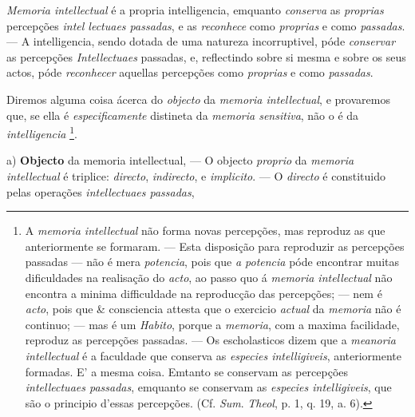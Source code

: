 
\emph{Memoria intellectual} é a propria intelligencia, emquanto \emph{conserva} as \emph{proprias} percepções \emph{intel lectuaes passadas}, e as \emph{reconhece} como \emph{proprias} e como \emph{passadas}. --- A intelligencia, sendo dotada de uma natureza incorruptivel, póde \emph{conservar} as percepções \emph{Intellectuaes} passadas, e, reflectindo     sobre si mesma e sobre os seus actos, póde \emph{reconhecer} aquellas percepções como \emph{proprias} e como \emph{passadas}.

Diremos alguma coisa ácerca do \emph{objecto} da \emph{memoria intellectual}, e provaremos que, se ella é \emph{especificamente} distineta da \emph{memoria sensitiva}, não o é da \emph{intelligencia} \footnote{A \emph{memoria intellectual} não forma novas percepções, mas reproduz as que anteriormente se formaram. --- Esta disposição para reproduzir as percepções passadas --- não é mera \emph{potencia}, pois que \emph{a potencia} póde encontrar muitas dificuldades na realisação do \emph{acto}, ao passo quo á \emph{memoria intellectual} não encontra a minima difficuldade na reproducção das percepções; --- nem é \emph{acto}, pois que \& consciencia attesta que o exercicio \emph{actual} da \emph{memoria} não é continuo; --- mas é um \emph{Habito}, porque a \emph{memoria}, com a maxima facilidade, reproduz as percepções passadas. --- Os escholasticos dizem que a \emph{meanoria intellectual} é a faculdade que conserva as \emph{especies intelligiveis}, anteriormente formadas. E' a mesma coisa. Emtanto se conservam as percepções \emph{intellectuaes passadas}, emquanto se conservam as \emph{especies intelligiveis}, que são o principio d'essas percepções. (Cf. \emph{Sum}. \emph{Theol}, p. 1, q. 19, a. 6).}.

a) \textbf{Objecto} da memoria intellectual, --- O objecto \emph{proprio} da \emph{memoria intellectual} é triplice: \emph{directo}, \emph{indirecto}, e \emph{implicito}. --- O \emph{directo} é constituido pelas operações \emph{intellectuaes passadas},


